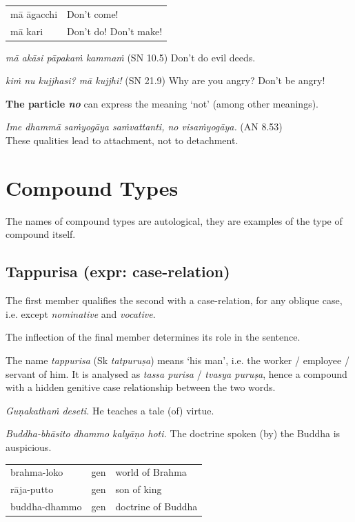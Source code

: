 \documentclass[11pt,oneside]{memoir}
\begin{document}
\begin{center}
\begin{tabular}{ll}
mā āgacchi & Don't come!\\[0pt]
mā kari & Don't do! Don't make!\\[0pt]
\end{tabular}
\end{center}

\emph{mā akāsi pāpakaṁ kammaṁ} (SN 10.5) Don’t do evil deeds.

\emph{kiṁ nu kujjhasi? mā kujjhi!} (SN 21.9) Why are you angry? Don't be angry!

\textbf{The particle \emph{no}} can express the meaning `not' (among other meanings).

\emph{Ime dhammā saṁyogāya saṁvattanti, no visaṁyogāya.} (AN 8.53) \\[0pt]
These qualities lead to attachment, not to detachment.

\clearpage

\section{Compound Types}
\label{sec:org9cf31ea}

\label{compound-types}

The names of compound types are autological, they are examples of the type of compound itself.

\subsection{Tappurisa (expr: case-relation)}
\label{sec:org2525b95}

The first member qualifies the second with a case-relation, for any oblique case, i.e. except \emph{nominative} and \emph{vocative}.

The inflection of the final member determines its role in the sentence.

The name \emph{tappurisa} (Sk \emph{tatpuruṣa}) means `his man', i.e. the worker /
employee / servant of him. It is analysed as \emph{tassa purisa} / \emph{tvasya puruṣa},
hence a compound with a hidden genitive case relationship between the two words.

\emph{Guṇakathaṁ deseti.} He teaches a tale (of) virtue.

\emph{Buddha-bhāsito dhammo kalyāṇo hoti.} The doctrine spoken (by) the Buddha is auspicious.

\begin{center}
\begin{tabular}{lll}
brahma-loko & gen & world of Brahma\\[0pt]
rāja-putto & gen & son of king\\[0pt]
buddha-dhammo & gen & doctrine of Buddha\\[0pt]
\end{tabular}
\end{center}
\end{document}
